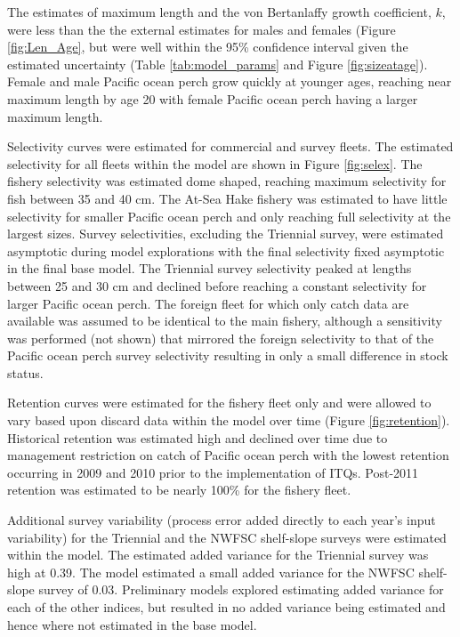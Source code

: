 \documentclass[12pt,]{article}
\begin{document}
The estimates of maximum length and the von Bertanlaffy growth
coefficient, \(k\), were less than the the external estimates for males
and females (Figure \ref{fig:Len_Age}, but were well within the 95\%
confidence interval given the estimated uncertainty (Table
\ref{tab:model_params} and Figure \ref{fig:sizeatage}). Female and male
Pacific ocean perch grow quickly at younger ages, reaching near maximum
length by age 20 with female Pacific ocean perch having a larger maximum
length.

Selectivity curves were estimated for commercial and survey fleets. The
estimated selectivity for all fleets within the model are shown in
Figure \ref{fig:selex}. The fishery selectivity was estimated dome
shaped, reaching maximum selectivity for fish between 35 and 40 cm. The
At-Sea Hake fishery was estimated to have little selectivity for smaller
Pacific ocean perch and only reaching full selectivity at the largest
sizes. Survey selectivities, excluding the Triennial survey, were
estimated asymptotic during model explorations with the final
selectivity fixed asymptotic in the final base model. The Triennial
survey selectivity peaked at lengths between 25 and 30 cm and declined
before reaching a constant selectivity for larger Pacific ocean perch.
The foreign fleet for which only catch data are available was assumed to
be identical to the main fishery, although a sensitivity was performed
(not shown) that mirrored the foreign selectivity to that of the Pacific
ocean perch survey selectivity resulting in only a small difference in
stock status.

Retention curves were estimated for the fishery fleet only and were
allowed to vary based upon discard data within the model over time
(Figure \ref{fig:retention}). Historical retention was estimated high
and declined over time due to management restriction on catch of Pacific
ocean perch with the lowest retention occurring in 2009 and 2010 prior
to the implementation of ITQs. Post-2011 retention was estimated to be
nearly 100\% for the fishery fleet.

Additional survey variability (process error added directly to each
year's input variability) for the Triennial and the NWFSC shelf-slope
surveys were estimated within the model. The estimated added variance
for the Triennial survey was high at 0.39. The model estimated a small
added variance for the NWFSC shelf-slope survey of 0.03. Preliminary
models explored estimating added variance for each of the other indices,
but resulted in no added variance being estimated and hence where not
estimated in the base model.
\end{document}
